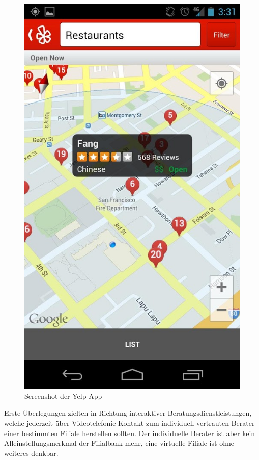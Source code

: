 \begin{figure}[h]
	\centering
	\includegraphics[scale=0.2]{Pictures/Yelp}
	\caption{Screenshot der Yelp-App \label{fig:Yelp}}
\end{figure}

	Erste Überlegungen zielten in Richtung interaktiver Beratungsdienstleistungen, welche jederzeit über Videotelefonie Kontakt zum individuell vertrauten Berater einer bestimmten Filiale herstellen sollten. Der individuelle Berater ist aber kein Alleinstellungsmerkmal der Filialbank mehr, eine virtuelle Filiale ist ohne weiteres denkbar.

